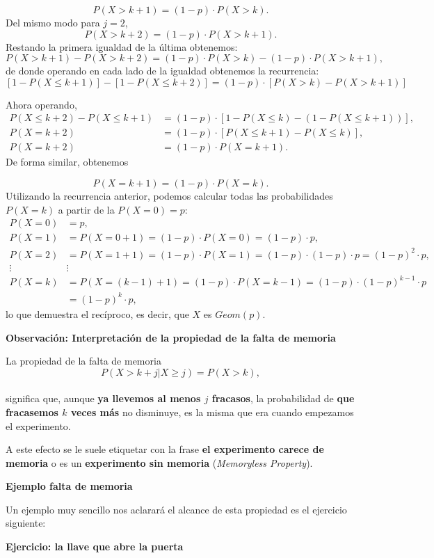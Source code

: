 \documentclass[]{book}
\begin{document}
\[
P(X>k+1)=(1-p)\cdot P(X>k).
\]
Del mismo modo para \(j=2\),
\[
P(X>k+2)=(1-p)\cdot P(X>k+1).
\]
Restando la primera igualdad de la última obtenemos:
\[
P(X>k+1)-P(X>k+2)=(1-p)\cdot P(X>k)-(1-p)\cdot P(X>k+1),
\]
de donde operando en cada lado de la igualdad obtenemos la recurrencia:
\[
[1-P(X\leq k+1)]-[1-P(X\leq k+2)]=(1-p)\cdot [P(X>k)-P(X>k+1)]
\]

Ahora operando,
\[
\begin{array}{rl}
P(X\leq k+2)-P(X\leq k+1) & =(1-p)\cdot[1-P(X\leq k)-\left(1-P(X\leq k+1)\right)],\\
P(X=k+2) & =(1-p)\cdot[P(X\leq k+1)-P(X\leq k)], \\
P(X=k+2) & =(1-p)\cdot P(X=k+1).
\end{array}
\]
De forma similar, obtenemos

\[
P(X=k+1)=(1-p)\cdot P(X=k).
\]
Utilizando la recurrencia anterior, podemos calcular todas las probabilidades \(P(X=k)\) a partir de la \(P(X=0)=p\):
\[
\begin{array}{rl}
P(X=0)&= p,\\
P(X=1)&=P(X=0+1)= (1-p)\cdot P(X=0) =(1-p)\cdot  p,\\
P(X=2)&=P(X=1+1)= (1-p)\cdot P(X=1)=(1-p)\cdot (1-p)\cdot p=(1-p)^2\cdot p,\\
 \vdots& \vdots \\
P(X=k)&=P(X=(k-1)+1)= (1-p)\cdot P(X=k-1)=(1-p)\cdot (1-p)^{k-1}\cdot p \\
& =(1-p)^{k}\cdot p,
\end{array}
\]
lo que demuestra el recíproco, es decir, que \(X\) es \(Geom(p)\).

 \textbf{Observación: Interpretación de la propiedad de la falta de memoria}

La propiedad de la falta de memoria
\[
P(X> k+j\big|X \geq j)=P(X > k),
\]\\
significa que, aunque \textbf{ya llevemos al menos \(j\) fracasos}, la probabilidad de \textbf{que fracasemos \(k\) veces más} no disminuye, es la misma que era cuando empezamos el experimento.

A este efecto se le suele etiquetar con la frase \textbf{el experimento carece de memoria} o es un \textbf{experimento sin memoria} (\emph{Memoryless Property}).

\textbf{Ejemplo falta de memoria}

Un ejemplo muy sencillo nos aclarará el alcance de esta propiedad es el ejercicio siguiente:

\textbf{Ejercicio: la llave que abre la puerta}
\end{document}
